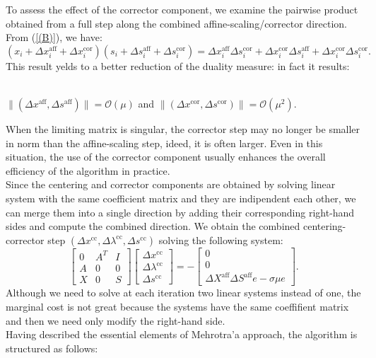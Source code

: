 \documentclass[a4paper,10 pt,titlepage,twoside]{book}
\theoremstyle{plain}
\theoremstyle{definition}
\theoremstyle{remark}
\begin{document}
To assess the effect of the corrector component, we examine the pairwise product obtained from a full step along the combined affine-scaling/corrector direction. From (\ref{(B)}), we have:
\begin{equation*}
(x_{i}+\Delta x_{i}^{\text{aff}}+\Delta x_{i}^{\text{cor}})(s_{i}+\Delta s_{i}^{\text{aff}}+\Delta s_{i}^{\text{cor}})= \Delta x_{i}^{\text{aff}}\Delta s_{i}^{\text{cor}}+\Delta x_{i}^{\text{cor}}\Delta s_{i}^{\text{aff}}+\Delta x_{i}^{\text{cor}}\Delta s_{i}^{\text{cor}}.
\end{equation*}
This result yelds to a better reduction of the duality measure: in fact it results:
\begin{center} 
	\\$\lVert(\Delta x^{\text{aff}},\Delta s^{\text{aff}}) \rVert = \mathcal{O}(\mu)$ and $\lVert(\Delta x^{\text{cor}},\Delta s^{\text{cor}}) \rVert = \mathcal{O}(\mu^{2})$.
\end{center}
When the limiting matrix is singular, the corrector step may no longer be smaller in norm than the affine-scaling step, ideed, it is often larger. Even in this situation, the use of the corrector component usually enhances the overall efficiency of the algorithm in practice.\\
Since the centering and corrector components are obtained by solving linear system with the same coefficient matrix and they are indipendent each other, we can merge them into a single direction by adding their corresponding right-hand sides and compute the combined direction. 
We obtain the combined centering-corrector step $(\Delta x^{\text{cc}}, \Delta \lambda^{\text{cc}}, \Delta s^{\text{cc}})$ solving the following system:
\begin{equation}\label{(C)}
\begin{bmatrix}
0&A^{T}&I \\A&0&0\\X&0&S
\end{bmatrix}\begin{bmatrix}
\Delta x^{\text{cc}}\\\Delta\lambda^{\text{cc}} \\\Delta s^{\text{cc}}
\end{bmatrix}=-\begin{bmatrix}
0\\0\\\Delta X^{\text{aff}}\Delta S^{\text{aff}}e - \sigma\mu e
\end{bmatrix}.
\end{equation}
Although we need to solve at each iteration two linear systems instead of one, the marginal cost is not great because the systems have the same coeffifient matrix and then we need only modify the right-hand side. \\
 Having described the essential elements of Mehrotra'a approach, the algorithm is structured as follows:
\\
\end{document}
